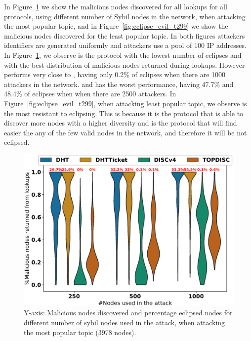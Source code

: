 In Figure~\ref{fig:eclipse_evil_t0} we show the malicious nodes discovered for all lookups for all protocols, using different number of Sybil nodes in the network,  when attacking the most popular topic,  and in Figure~\ref{fig:eclipse_evil_t299} we show the malicious nodes discovered for the least popular topic.  In both figures attackers identifiers are generated uniformly and attackers use a pool of 100 IP addresses. 
In Figure~\ref{fig:eclipse_evil_t0}, we observe \discv is the protocol with the lowest number of eclipses and with the best distribution of malicious nodes returned during lookups.  However \sysname performs very close to \discv, having only 0.2\% of eclipses when there are 1000 attackers in the network.
\altname and \altnameticket has the worst performance,  having 47.7\% and 48.4\% of eclipses when when there are 2500 attackers.
In Figure~\ref{fig:eclipse_evil_t299}, when attacking least popular topic, we observe \sysname is the most resistant to eclipsing.
This is because it is the protocol that is able to discover more nodes with a higher diversity and is the protocol that will find easier the any of the few valid nodes in the network, and therefore it will be not eclipsed.
 
\begin{figure}[!h]
\includegraphics[width=\linewidth]{results/security/violin_percentEvil_percentageMaliciousDiscovered_t0.eps}
\caption{Y-axis: Malicious nodes discovered and percentage eclipsed nodes for different number of sybil nodes used in the attack,  when attacking the most popular topic (3978 nodes).}
\label{fig:eclipse_evil_t0}
\end{figure}

